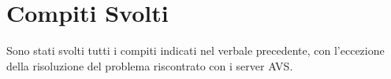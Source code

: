 \documentclass[../verbale-2017-04-20.tex]{subfiles}
\begin{document}
	\section{Compiti Svolti}
		Sono stati svolti tutti i compiti indicati nel verbale precedente, con l'eccezione della risoluzione del problema riscontrato con i server AVS.
\end{document}
